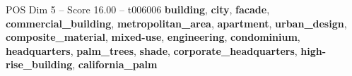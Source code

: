 \begin{textsample}{POS Dim 5 – Score 16.00 – t006006}  \label{ex:f5_pos_025}
\textbf{building}, \textbf{city}, \textbf{facade}, \textbf{commercial\_building}, \textbf{metropolitan\_area}, \textbf{apartment}, \textbf{urban\_design}, \textbf{composite\_material}, \textbf{mixed-use}, \textbf{engineering}, \textbf{condominium}, \textbf{headquarters}, \textbf{palm\_trees}, \textbf{shade}, \textbf{corporate\_headquarters}, \textbf{high-rise\_building}, \textbf{california\_palm}

\end{textsample}
